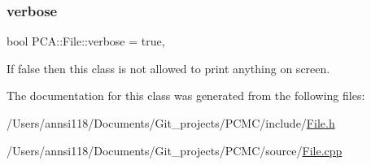 \subsubsection{\texorpdfstring{verbose}{verbose}}
{\footnotesize\ttfamily bool P\+C\+A\+::\+File\+::verbose = true\hspace{0.3cm}{\ttfamily [static]}, {\ttfamily [private]}}



If false then this class is not allowed to print anything on screen. 



The documentation for this class was generated from the following files\+:\begin{DoxyCompactItemize}
\item 
/\+Users/annsi118/\+Documents/\+Git\+\_\+projects/\+P\+C\+M\+C/include/\hyperlink{_file_8h}{File.\+h}\item 
/\+Users/annsi118/\+Documents/\+Git\+\_\+projects/\+P\+C\+M\+C/source/\hyperlink{_file_8cpp}{File.\+cpp}\end{DoxyCompactItemize}
